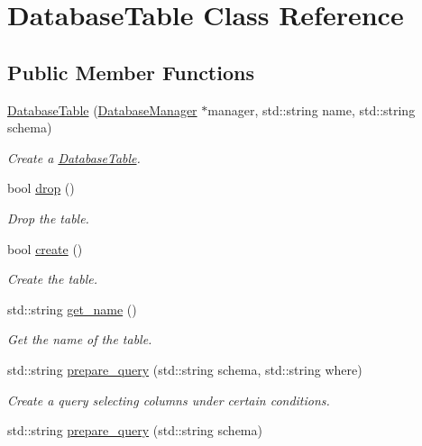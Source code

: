 \hypertarget{class_database_table}{}\section{Database\+Table Class Reference}
\label{class_database_table}
\subsection*{Public Member Functions}
\begin{DoxyCompactItemize}
\item 
\hyperlink{class_database_table_a6b1dcd25d72f28fc57168ac53b6d9a97}{Database\+Table} (\hyperlink{class_database_manager}{Database\+Manager} $\ast$manager, std\+::string name, std\+::string schema)
\begin{DoxyCompactList}\small\item\em Create a \hyperlink{class_database_table}{Database\+Table}. \end{DoxyCompactList}\item 
bool \hyperlink{class_database_table_aa067ec606ff957adca71f14061d101f3}{drop} ()
\begin{DoxyCompactList}\small\item\em Drop the table. \end{DoxyCompactList}\item 
bool \hyperlink{class_database_table_aeb54ac793ed40aa4e2517dbb616f86ed}{create} ()
\begin{DoxyCompactList}\small\item\em Create the table. \end{DoxyCompactList}\item 
std\+::string \hyperlink{class_database_table_aaca8178d392b95d67245e61e2d3630a9}{get\+\_\+name} ()
\begin{DoxyCompactList}\small\item\em Get the name of the table. \end{DoxyCompactList}\item 
std\+::string \hyperlink{class_database_table_afcae3a4f668aa7b6808870d6cc1abd81}{prepare\+\_\+query} (std\+::string schema, std\+::string where)
\begin{DoxyCompactList}\small\item\em Create a query selecting columns under certain conditions. \end{DoxyCompactList}\item 
std\+::string \hyperlink{class_database_table_a9478ff6a4d02787fabbfbd7f3e970fc0}{prepare\+\_\+query} (std\+::string schema)

\end{DoxyCompactItemize}
